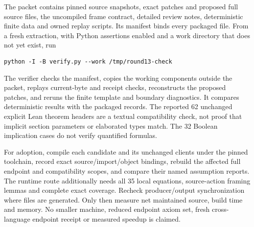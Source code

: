 \documentclass[11pt]{article}
\begin{document}
The packet contains pinned source snapshots, exact patches and proposed full source files, the uncompiled frame contract, detailed review notes, deterministic finite data and owned replay scripts. Its manifest binds every packaged file. From a fresh extraction, with Python assertions enabled and a work directory that does not yet exist, run
\begin{verbatim}
python -I -B verify.py --work /tmp/round13-check
\end{verbatim}
The verifier checks the manifest, copies the working components outside the packet, replays current-byte and receipt checks, reconstructs the proposed patches, and reruns the finite template and boundary diagnostics. It compares deterministic results with the packaged records. The reported 62 unchanged explicit Lean theorem headers are a textual compatibility check, not proof that implicit section parameters or elaborated types match. The 32 Boolean implication cases do not verify quantified formulas.

For adoption, compile each candidate and its unchanged clients under the pinned toolchain, record exact source/import/object bindings, rebuild the affected full endpoint and compatibility scopes, and compare their named assumption reports. The runtime route additionally needs all 35 local equations, source-action framing lemmas and complete exact coverage. Recheck producer/output synchronization where files are generated. Only then measure net maintained source, build time and memory. No smaller machine, reduced endpoint axiom set, fresh cross-language endpoint receipt or measured speedup is claimed.
\end{document}
